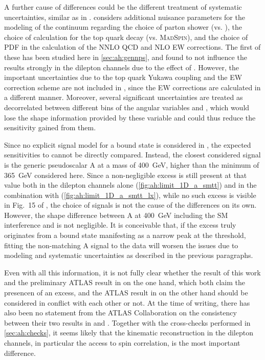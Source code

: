 A further cause of differences could be the different treatment of systematic uncertainties, similar as in .  considers additional nuisance parameters for the modeling of the \ttbar continuum regarding the choice of parton shower (\pythia vs. \herwig), the choice of calculation for the top quark decay (\powheg vs. \textsc{MadSpin}), and the choice of PDF in the calculation of the NNLO QCD and NLO EW corrections. The first of these has been studied here in \cref{sec:ah:gennps}, and found to not influence the results strongly in the dilepton channels due to the effect of \chel. However, the important uncertainties due to the top quark Yukawa coupling and the EW correction scheme are not included in , since the EW corrections are calculated in a different manner. Moreover, several significant uncertainties are treated as decorrelated between different bins of the angular variables \cost and \dphill, which would lose the shape information provided by these variable and could thus reduce the sensitivity gained from them.

Since no explicit signal model for a \ttbar bound state is considered in , the expected sensitivities to \etat cannot be directly compared. Instead, the closest considered signal is the generic pseudoscalar A at a mass of \SI{400}{\GeV}, higher than the minimum of \SI{365}{\GeV} considered here. Since a non-negligible excess is still present at that value both in the dilepton channels alone (\cref{fig:ah:limit_1D_a_smtt}) and in the combination with \ljets (\cref{fig:ah:limit_1D_a_smtt_lx}), while no such excess is visible in Fig.~15 of , the choice of signals is not the cause of the differences on its own. However, the shape difference between A at \SI{400}{\GeV} including the SM interference and \etat is not negligible. It is conceivable that, if the excess truly originates from a \ttbar bound state manifesting as a narrow peak at the \ttbar threshold, fitting the non-matching A signal to the data will worsen the issues due to modeling and systematic uncertainties as described in the previous paragraphs.

Even with all this information, it is not fully clear whether the result of this work and the preliminary ATLAS result in  on the one hand, which both claim the presencen of an excess, and the ATLAS result in  on the other hand should be considered in conflict with each other or not. At the time of writing, there has also been no statement from the ATLAS Collaboration on the consistency between their two results in  and . Together with the cross-checks performed in \cref{sec:ah:checks}, it seems likely that the \ttbar kinematic reconstruction in the dilepton channels, in particular the access to spin correlation, is the most important difference.

